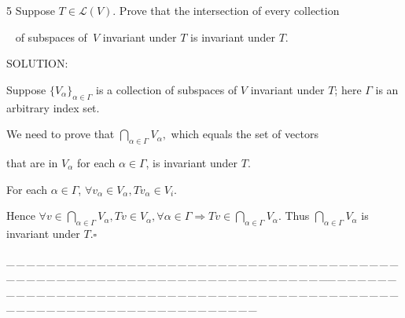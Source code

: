 \documentclass[a4paper, 11pt, UTF8]{article}
\def\Lm{\mathcal{L}}
\begin{document}
\begin{large}
{\timesbf\Large 5} {\timessl\Large 
Suppose $T\in\Lm(V)$. Prove that the intersection of every collection}\par\,\,\,
{\timessl\Large of subspaces of \,$V$ invariant under $T$ is invariant under $T$.
}\par
{\timesbf S\footnotesize{OLUTION:}}\par\quad
Suppose $\{V_\alpha\}_{\alpha\in\Gamma}$ is a collection of subspaces of $V$ invariant under $T$; here $\Gamma$ is an arbitrary index set.\par\quad
We need to prove that $\bigcap_{\alpha\in\Gamma}V_\alpha,$ which equals the set of vectors\par\qquad\qquad\qquad\qquad that are in $V_\alpha$ for each $\alpha\in\Gamma$, is invariant under $T$.\par\quad
For each $\alpha\in\Gamma$, $\forall v_\alpha\in V_\alpha,Tv_\alpha\in V_i.$\par\quad
Hence $\forall v\in \bigcap_{\alpha\in\Gamma}V_\alpha,Tv\in V_\alpha,\forall\alpha\in\Gamma\Rightarrow Tv\in\bigcap_{\alpha\in\Gamma}V_\alpha.$
Thus $\bigcap_{\alpha\in\Gamma}V_\alpha$ is invariant under $T$.\quad$\square$\par
{\tiny \_\,\_\,\_\,\_\,\_\,\_\,\_\,\_\,\_\,\_\,\_\,\_\,\_\,\_\,\_\,\_\,\_\,\_\,\_\,\_\,\_\,\_\,\_\,\_\,\_\,\_\,\_\,\_\,\_\,\_\,\_\,\_\,\_\,\_\,\_\,\_\,\_\,\_\,\_\,\_\,\_\,\_\,\_\,\_\,\_\,\_\,\_\,\_\,\_\,\_\,\_\,\_\,\_\,\_\,\_\,\_\,\_\,\_\,\_\,\_\,\_\,\_\,\_\,\_\,\_\,\_\,\_\,\_\,\_\,\_\,\_\_\,\_\,\_\,\_\,\_\,\_\,\_\,\_\,\_\,\_\,\_\,\_\,\_\,\_\,\_\,\_\,\_\,\_\,\_\,\_\,\_\,\_\,\_\,\_\,\_\,\_\,\_\,\_\,\_\,\_\,\_\,\_\,\_\,\_\,\_\,\_\,\_\,\_\,\_\,\_\,\_\,\_\,\_\,\_\,\_\,\_\,\_\,\_\,\_\,\_\,\_\,\_\,\_\,\_\,\_\,\_\,\_\,\_\,\_\,\_\,\_\,\_\,\_\,\_\,\_\,\_\,\_\,\_\,\_\,\_\,\_}\par


\end{large}
\end{document}
